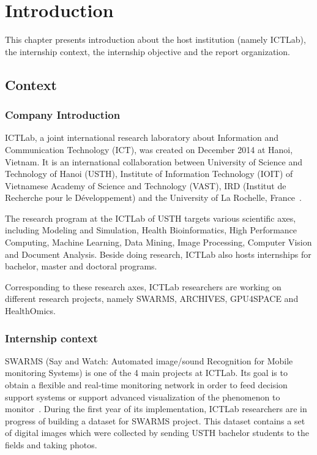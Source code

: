 \chapter{Introduction}
\label{chapter_1}

This chapter presents introduction about the host institution (namely ICTLab), the internship context, the internship objective and the report organization. 

\section{Context}

\subsection{Company Introduction}

ICTLab, a joint international research laboratory about Information and Communication Technology (ICT), was created on December 2014 at Hanoi, Vietnam. It is an international collaboration between University of Science and Technology of Hanoi (USTH), Institute of Information Technology (IOIT) of Vietnamese Academy of Science and Technology (VAST), IRD (Institut de Recherche pour le Développement) and the University of La Rochelle, France~\cite{ictlab}.

The research program at the ICTLab of USTH targets various scientific axes, including Modeling and Simulation, Health Bioinformatics, High Performance Computing, Machine Learning, Data Mining, Image Processing, Computer Vision and Document Analysis. Beside doing research, ICTLab also hosts internships for bachelor, master and doctoral programs.

Corresponding to these research axes, ICTLab researchers are working on different research projects, namely SWARMS, ARCHIVES, GPU4SPACE and HealthOmics. 

\subsection{Internship context}

SWARMS (Say and Watch: Automated image/sound Recognition for Mobile monitoring Systems) is one of the 4 main projects at ICTLab. Its goal is to obtain a flexible and real-time monitoring network in order to feed decision support systems or support advanced visualization of the phenomenon to monitor~\cite{ictlab}. During the first year of its implementation, ICTLab researchers are in progress of building a dataset for SWARMS project. This dataset contains a set of digital images which were collected by sending USTH bachelor students to the fields and taking photos. 

